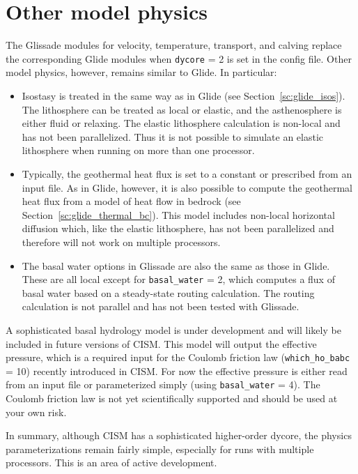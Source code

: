 
\section{Other model physics}
\label{glissade-physics}
The Glissade modules for velocity, temperature, transport, and calving replace the
corresponding Glide modules when \texttt{dycore} = 2 is set in the config file.
Other model physics, however, remains similar to Glide.  In particular:

\begin{itemize}


\item Isostasy is treated in the same way as in Glide (see Section~\ref{sc:glide_isos}).
The lithosphere can be treated as local or elastic, and the asthenosphere is
either fluid or relaxing.  The elastic lithosphere calculation
is non-local and has not been parallelized.  Thus it is not possible to simulate
an elastic lithosphere when running on more than one processor.

\item Typically, the geothermal heat flux is set to a constant or prescribed from
an input file.  As in Glide, however, it is also possible to compute the
geothermal heat flux from a model of heat flow in bedrock (see Section~\ref{sc:glide_thermal_bc}).
This model includes non-local horizontal diffusion which, like the elastic
lithosphere, has not been parallelized and therefore will not work on multiple
processors.

\item The basal water options in Glissade are also the same as those in Glide.
These are all local except for \texttt{basal\_water} = 2, which computes a flux
of basal water based on a steady-state routing calculation.  The routing calculation
is not parallel and has not been tested with Glissade.

\end{itemize}

A sophisticated basal hydrology model is under development and will likely be
included in future versions of CISM.  This model will output the effective pressure,
which is a required input for the Coulomb friction law
(\texttt{which\_ho\_babc} = 10) recently introduced in CISM.
For now the effective pressure is either read from an input file
or parameterized simply (using \texttt{basal\_water} = 4).
The Coulomb friction law is not yet scientifically supported and
should be used at your own risk.

In summary, although CISM has a sophisticated higher-order dycore,
the physics parameterizations remain fairly simple, especially for runs
with multiple processors.  This is an area of active development.

